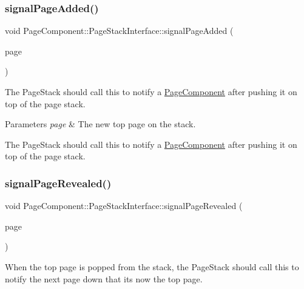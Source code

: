 \subsubsection{\texorpdfstring{signal\+Page\+Added()}{signalPageAdded()}}
{\footnotesize\ttfamily void Page\+Component\+::\+Page\+Stack\+Interface\+::signal\+Page\+Added (\begin{DoxyParamCaption}\item[{\mbox{\hyperlink{classPageComponent}{Page\+Component}} $\ast$}]{page }\end{DoxyParamCaption})\hspace{0.3cm}{\ttfamily [protected]}}

The Page\+Stack should call this to notify a \mbox{\hyperlink{classPageComponent}{Page\+Component}} after pushing it on top of the page stack.


\begin{DoxyParams}{Parameters}
{\em page} & The new top page on the stack.\\
\hline
\end{DoxyParams}
The Page\+Stack should call this to notify a \mbox{\hyperlink{classPageComponent}{Page\+Component}} after pushing it on top of the page stack. \mbox{\label{classPageComponent_1_1PageStackInterface_ac4d38e0118bf43041dd650669415b058}} 
\subsubsection{\texorpdfstring{signal\+Page\+Revealed()}{signalPageRevealed()}}
{\footnotesize\ttfamily void Page\+Component\+::\+Page\+Stack\+Interface\+::signal\+Page\+Revealed (\begin{DoxyParamCaption}\item[{\mbox{\hyperlink{classPageComponent}{Page\+Component}} $\ast$}]{page }\end{DoxyParamCaption})\hspace{0.3cm}{\ttfamily [protected]}}

When the top page is popped from the stack, the Page\+Stack should call this to notify the next page down that it\textquotesingle{}s now the top page.


